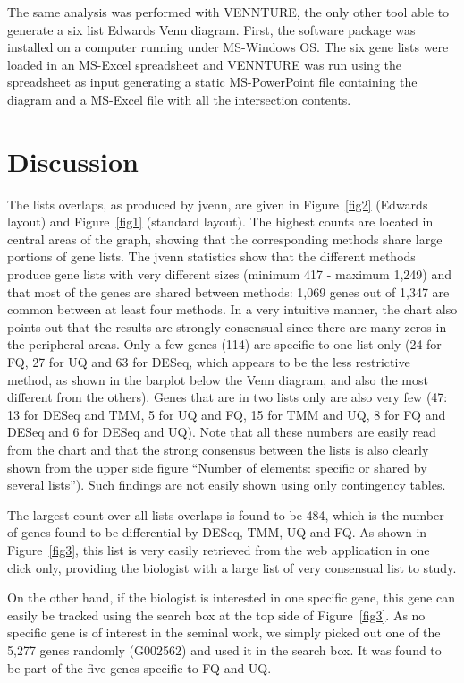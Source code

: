 \documentclass[11pt]{bmc_article_s50}
\begin{document}
The same analysis was performed with VENNTURE, the only other tool able to
generate a six list Edwards Venn diagram. First, the software package was
installed on a computer running under MS-Windows OS. The six gene lists were
loaded in an MS-Excel spreadsheet and VENNTURE was run using the spreadsheet as
input generating a static MS-PowerPoint file containing the diagram and a MS-Excel
file with all the intersection contents.

\section*{Discussion}

The lists overlaps, as produced by jvenn, are given in Figure~\ref{fig2}
(Edwards layout) and Figure~\ref{fig1} (standard layout). The highest counts
are located in central areas of the graph, showing that the corresponding
methods share large portions of gene lists. The jvenn statistics show that the
different methods produce gene lists with very different sizes (minimum 417 -
maximum 1,249) and that most of the genes are shared between methods: 1,069
genes out of 1,347 are common between at least four methods.
In a very intuitive manner, the chart also points out that the results are
strongly consensual since there are many zeros in the peripheral areas. Only a
few genes (114) are specific to one list only (24 for FQ, 27 for UQ and 63 for
DESeq, which appears to be the less restrictive method, as shown in the barplot
below the Venn diagram, and also the most different from the others).
Genes that are in two lists only are also very few (47: 13 for DESeq and TMM, 5
for UQ and FQ, 15 for TMM and UQ, 8 for FQ and DESeq and 6 for DESeq and UQ).
Note that all these numbers are easily read from the chart and that the strong
consensus between the lists is also clearly shown from the upper side figure
``Number of elements: specific or shared by several lists''). Such findings are
not easily shown using only contingency tables.

The largest count over all lists overlaps is found to be 484, which is the
number of genes found to be differential by DESeq, TMM, UQ and FQ. As shown in
Figure~\ref{fig3}, this list is very easily retrieved from the web application
in one click only, providing the biologist with a large list of very consensual
list to study.

On the other hand, if the biologist is interested in one specific gene, this
gene can easily be tracked using the search box at the top side of
Figure~\ref{fig3}. As no specific gene is of interest in the seminal work, we
simply picked out one of the 5,277 genes randomly (G002562) and used it in the
search box. It was found to be part of the five genes specific to FQ and UQ.
\end{document}
